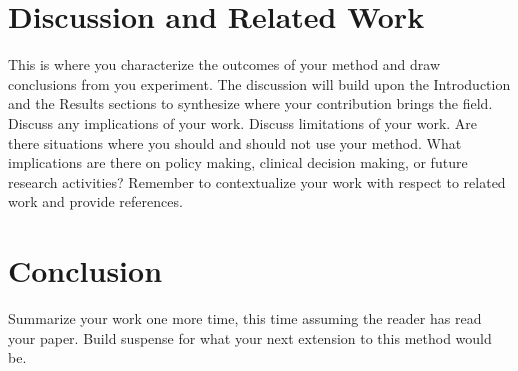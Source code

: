 \documentclass[twoside,11pt]{article}
\begin{document}
\section{Discussion and Related Work} 

This is where you characterize the outcomes of your method and draw conclusions from you experiment.
The discussion will build upon the Introduction and the Results sections to synthesize where your contribution brings the field. Discuss any implications of your work. 
Discuss limitations of your work.
Are there situations where you should and should not use your method.
What implications are there on policy making, clinical decision making, or future research activities?
Remember to contextualize your work with respect to related work and provide references.

\section{Conclusion} 
Summarize your work one more time, this time assuming the reader has read your paper.
Build suspense for what your next extension to this method would be.

\end{document}
